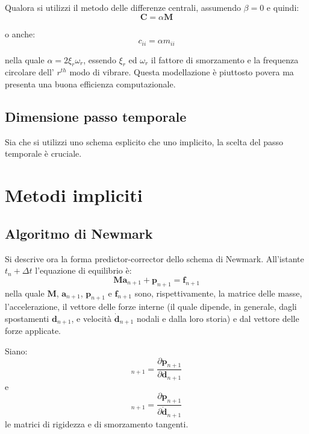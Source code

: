 Qualora si utilizzi il metodo delle differenze centrali, assumendo $\beta = 0$ e quindi:
\begin{equation}
	\boldsymbol{C} = \alpha \boldsymbol{M}
\end{equation}

o anche:
\begin{equation*}
	c_{ii} = \alpha m_{ii}
\end{equation*}

nella quale $\alpha = 2 \xi_{r} \omega_{r} $, essendo $\xi_{r}$ ed $\omega_{r}$ il 
fattore di smorzamento e la frequenza circolare dell' $r^{th}$ modo di vibrare. 
Questa modellazione è piuttosto povera ma presenta una buona efficienza computazionale.

\subsection{Dimensione passo temporale}
Sia che si utilizzi uno schema esplicito che uno implicito, la scelta del passo temporale è cruciale.


\section{Metodi impliciti}

\subsection{Algoritmo di Newmark}
Si descrive ora la forma predictor-corrector dello schema di Newmark. 
All'istante $t_n + \varDelta t$ l'equazione di equilibrio è:
\begin{equation}
	\boldsymbol{M a}_{n+1} +\boldsymbol{p}_{n+1} = \boldsymbol{f}_{n+1}
	\label{eq:equilibrio}
\end{equation}
nella quale $\boldsymbol{M}$, $\boldsymbol{a}_{n+1}$, $\boldsymbol{p}_{n+1}$ e $\boldsymbol{f}_{n+1}$ sono, 
rispettivamente, la matrice delle masse, l'accelerazione, il vettore delle forze interne
(il quale dipende, in generale, dagli spostamenti $\boldsymbol{d}_{n+1}$, 
e velocità $\boldsymbol{\dot{d}}_{n+1}$ nodali e dalla loro storia) e dal vettore delle forze applicate.

Siano:
\begin{equation}
	[\boldsymbol{K}_T]_{n+1} = \frac{\partial {\boldsymbol{p}_{n+1}}}{\partial {\boldsymbol{d}_{n+1}}}
\end{equation}
e
\begin{equation}
	[\boldsymbol{C}_T]_{n+1} = \frac{\partial {\boldsymbol{p}_{n+1}}}{\partial {\boldsymbol{\dot{d}}_{n+1}}}	
\end{equation}
le matrici di rigidezza e di smorzamento tangenti.

